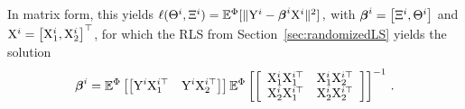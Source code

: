 In matrix form, this yields
$\ell(\Theta^i, \Xi^i) = \mathbb{E}^\Phi[\|\mathrm{Y}^i - \boldsymbol{\beta}^i\mathrm{X}^i\|^2]\,,$ with $\boldsymbol{\beta}^i=\begin{bmatrix}\Xi^i, \Theta^i\end{bmatrix}$
and
$\mathrm{X}^i= \begin{bmatrix}\mathrm{X}_1^i, \mathrm{X}_2^i\end{bmatrix}^{\top}$,
for which the RLS from Section~\ref{sec:randomizedLS}
yields the solution
\begin{equation}\label{eq:betaestimator}
    \boldsymbol{\beta}^i = \mathbb{E}^\Phi\left[
    \left[\mathrm{Y}^i\mathrm{X}_1^{i\top} \quad \mathrm{Y}^i\mathrm{X}_2^{i\top}\right] \right]
    \mathbb{E}^\Phi\left[
    \left[\begin{array}{cc}
         \mathrm{X}_1^i\mathrm{X}_1^{i\top} & \mathrm{X}_1^i\mathrm{X}_2^{i\top} \\
         \mathrm{X}_2^i\mathrm{X}_1^{i\top} & \mathrm{X}_2^i\mathrm{X}_2^{i\top}
    \end{array}\right]\right]^{-1}\,.
\end{equation}


\newpage
